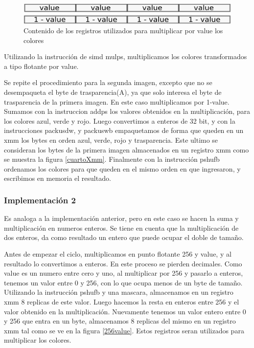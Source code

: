 \documentclass[a4paper]{article}
\begin{document}
\begin{figure}[H]
\centering
\includegraphics[scale=0.8]{imagenes/value.png}
\caption{Contenido de los registros utilizados para multiplicar por value los colores}
\label{value}
\end{figure}


Utilizando la instrucción de simd mulps, multiplicamos los colores transformados a tipo flotante por value.

Se repite el procedimiento para la segunda imagen, excepto que no se desempaqueta el byte de trasparencia(A), ya que solo interesa el byte de trasparencia de la primera imagen. En este caso multiplicamos por 1-value. Sumamos con la instruccion addps los valores obtenidos en la multiplicación, para los colores azul, verde y rojo. Luego convertimos a enteros de 32 bit, y con la instrucciones packusdw, y packuswb empaquetamos de forma que queden en un xmm los bytes en orden azul, verde, rojo y trasparencia. Este ultimo se consideran los bytes de la primera imagen almacenados en un registro xmm como se muestra la figura \ref{cuartoXmm}. Finalmente con la instrucción pshufb ordenamos los colores para que queden en el mismo orden en que ingresaron, y escribimos en memoria el resultado.

\subsubsection{Implementación 2}

Es analoga a la implementación anterior, pero en este caso se hacen la suma y multiplicación en numeros enteros. Se tiene en cuenta que la multiplicación de dos enteros, da como resultado un entero que puede ocupar el doble de tamaño.

Antes de empezar el ciclo, multiplicamos en punto flotante 256 y value, y al resultado lo convertimos a enteros. En este proceso se pierden decimales. Como value es un numero entre cero y uno, al multiplicar por 256 y pasarlo a enteros, tenemos un valor entre 0 y 256, con lo que ocupa menos de un byte de tamaño. Utilizando la instrucción pshufb y una mascara, almacenamos en un registro xmm 8 replicas de este valor. Luego hacemos la resta en enteros entre 256 y el valor obtenido en la multiplicación. Nuevamente tenemos un valor entero entre 0 y 256 que entra en un byte, almacenamos 8 replicas del mismo en un registro xmm tal como se ve en la figura \ref{256value}. Estos registros seran utilizados para multiplicar los colores.
\end{document}
